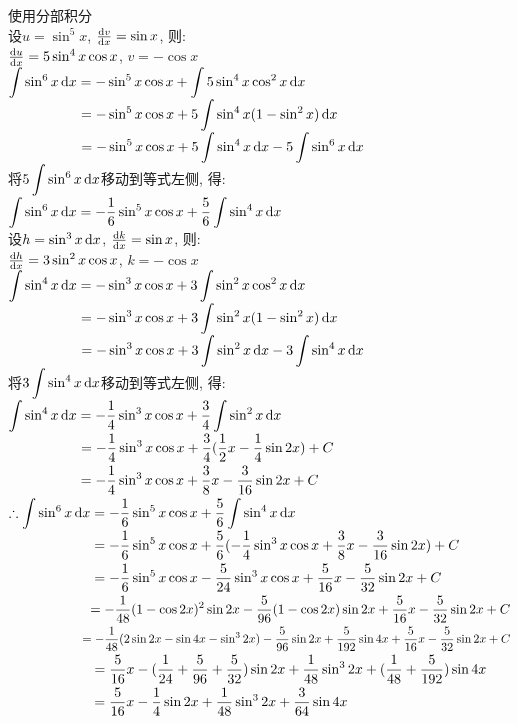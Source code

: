 使用分部积分\\
设$u=\sin^5x$, $\frac{\mathop{}\!\mathrm{d} v}{\mathop{}\!\mathrm{d} x}=\sin x$, 则:\\
\phantom{设}$\frac{\mathop{}\!\mathrm{d} u}{\mathop{}\!\mathrm{d} x}=5\sin^4x\cos x$, $v=-\cos x$\\
$\displaystyle\int\sin^6x\mathop{}\!\mathrm{d} x=-\sin^5x\cos x+\int5\sin^4x\cos^2x\mathop{}\!\mathrm{d} x$\\
$\displaystyle\phantom{\int\sin^6x\dif x}=-\sin^5x\cos x+5\int\sin^4x(1-\sin^2x)\dif x$\\
$\displaystyle\phantom{\int\sin^6x\dif x}=-\sin^5x\cos x+5\int\sin^4x\dif x-5\int\sin^6x\dif x$\\
将$\displaystyle5\int\sin^6x\mathop{}\!\mathrm{d} x$移动到等式左侧, 得:\\
$\displaystyle\int\sin^6x\mathop{}\!\mathrm{d} x=-\frac{1}{6}\sin^5x\cos x+\frac{5}{6}\int\sin^4x\mathop{}\!\mathrm{d} x$\\
设$h=\sin^3x\mathop{}\!\mathrm{d} x$, $\frac{\mathop{}\!\mathrm{d} k}{\mathop{}\!\mathrm{d} x}=\sin x$, 则:\\
\phantom{设}$\frac{\mathop{}\!\mathrm{d} h}{\mathop{}\!\mathrm{d} x}=3\sin^2x\cos x$, $k=-\cos x$\\
$\displaystyle\int\sin^4x\mathop{}\!\mathrm{d} x=-\sin^3x\cos x+3\int\sin^2x\cos^2x\mathop{}\!\mathrm{d} x$\\
$\displaystyle\phantom{\int\sin^4x\dif x}=-\sin^3x\cos x+3\int\sin^2x(1-\sin^2x)\dif x$\\
$\displaystyle\phantom{\int\sin^4x\dif x}=-\sin^3x\cos x+3\int\sin^2x\dif x-3\int\sin^4x\dif x$\\
将$\displaystyle3\int\sin^4x\mathop{}\!\mathrm{d} x$移动到等式左侧, 得:\\
$\displaystyle\int\sin^4x\mathop{}\!\mathrm{d} x=-\frac{1}{4}\sin^3x\cos x+\frac{3}{4}\int\sin^2x\mathop{}\!\mathrm{d} x$\\
$\displaystyle\phantom{\int\sin^4x\dif x}=-\frac{1}{4}\sin^3x\cos x+\frac{3}{4}(\frac{1}{2}x-\frac{1}{4}\sin2x)+C$\\
$\displaystyle\phantom{\int\sin^4x\dif x}=-\frac{1}{4}\sin^3x\cos x+\frac{3}{8}x-\frac{3}{16}\sin2x+C$\\
$\displaystyle\therefore\int\sin^6x\mathop{}\!\mathrm{d} x=-\frac{1}{6}\sin^5x\cos x+\frac{5}{6}\int\sin^4x\mathop{}\!\mathrm{d} x$\\
$\displaystyle\phantom{\therefore\int\sin^6x\dif x}=-\frac{1}{6}\sin^5x\cos x+\frac{5}{6}(-\frac{1}{4}\sin^3x\cos x+\frac{3}{8}x-\frac{3}{16}\sin2x)+C$\\
$\displaystyle\phantom{\therefore\int\sin^6x\dif x}=-\frac{1}{6}\sin^5x\cos x-\frac{5}{24}\sin^3x\cos x+\frac{5}{16}x-\frac{5}{32}\sin2x+C$\\
$\displaystyle\phantom{\therefore\int\sin^6x\dif x}=-\frac{1}{48}(1-\cos2x)^2\sin2x-\frac{5}{96}(1-\cos2x)\sin2x+\frac{5}{16}x-\frac{5}{32}\sin2x+C$\\
$\displaystyle\phantom{\therefore\int\sin^6x\dif x}=-\frac{1}{48}(2\sin2x-\sin4x-\sin^32x)-\frac{5}{96}\sin2x+\frac{5}{192}\sin4x+\frac{5}{16}x-\frac{5}{32}\sin2x+C$\\
$\displaystyle\phantom{\therefore\int\sin^6x\dif x}=\frac{5}{16}x-(\frac{1}{24}+\frac{5}{96}+\frac{5}{32})\sin2x+\frac{1}{48}\sin^32x+(\frac{1}{48}+\frac{5}{192})\sin4x$\\
$\displaystyle\phantom{\therefore\int\sin^6x\dif x}=\frac{5}{16}x-\frac{1}{4}\sin2x+\frac{1}{48}\sin^32x+\frac{3}{64}\sin4x$\\

